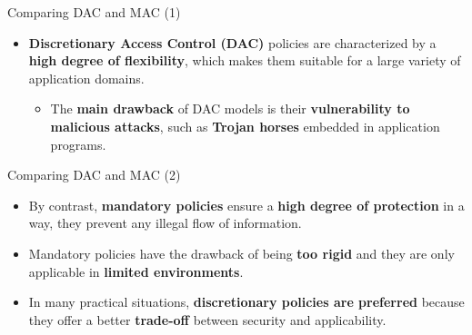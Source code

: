 \begin{frame}{Comparing DAC and MAC (1)}
    \Large
    \begin{itemize}
        \item \textbf{Discretionary Access Control (DAC)} policies are characterized by a \textbf{high degree of flexibility}, which makes them suitable for a large variety of application domains.
        
        \vspace{0.3cm} 
        \begin{itemize}
            \large %
            \item The \textbf{main drawback} of DAC models is their \textbf{vulnerability to malicious attacks}, such as \textbf{Trojan horses} embedded in application programs.
        \end{itemize}
    \end{itemize}
\end{frame}


\begin{frame}{Comparing DAC and MAC (2)}
    \Large
    \begin{itemize}
        \item By contrast, \textbf{mandatory policies} ensure a \textbf{high degree of protection} in a way, they prevent any illegal flow of information.
        
        \vspace{0.3cm}
        \item Mandatory policies have the drawback of being \textbf{too rigid} and they are only applicable in \textbf{limited environments}.
        
        \vspace{0.3cm}
        \item In many practical situations, \textbf{discretionary policies are preferred} because they offer a better \textbf{trade-off} between security and applicability.
    \end{itemize}
\end{frame}
